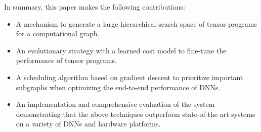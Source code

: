 In summary, this paper makes the following contributions:

\begin{itemize}[topsep=-0.1em, itemsep=-0.1em]
    \item A mechanism to generate a large hierarchical search space of tensor programs for a computational graph.
    \item An evolutionary strategy with a learned cost model to fine-tune the performance of tensor programs.
    \item A scheduling algorithm based on gradient descent to prioritize important subgraphs when optimizing the end-to-end performance of DNNs.
    \item An implementation and comprehensive evaluation of the \Ansor system demonstrating that the above techniques outperform state-of-the-art systems on a variety of DNNs and hardware platforms.
\end{itemize}
